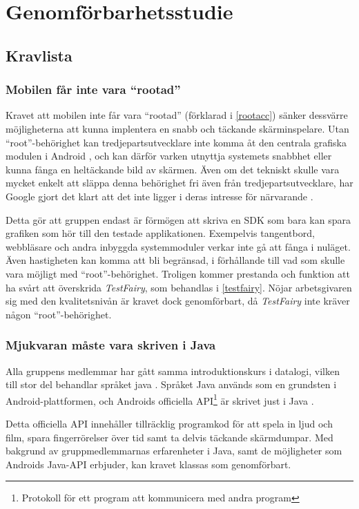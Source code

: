 \section{Genomförbarhetsstudie}
\subsection{Kravlista}
\subsubsection{Mobilen får inte vara ``rootad''}
Kravet att mobilen inte får vara ``rootad'' (förklarad i \ref{rootacc}) sänker dessvärre möjligheterna att kunna implentera en snabb och täckande skärminspelare. Utan ``root''-behörighet kan tredjepartsutvecklare inte komma åt den centrala grafiska modulen i Android \parencite{adoc}, och kan därför varken utnyttja systemets snabbhet eller kunna fånga en heltäckande bild av skärmen. Även om det tekniskt skulle vara mycket enkelt att släppa denna behörighet fri även från tredjepartsutvecklare, har Google gjort det klart att det inte ligger i deras intresse för närvarande \parencite{uhno}.

Detta gör att gruppen endast är förmögen att skriva en SDK som bara kan spara grafiken som hör till den testade applikationen. Exempelvis tangentbord, webbläsare och andra inbyggda systemmoduler verkar inte gå att fånga i nuläget. Även hastigheten kan komma att bli begränsad, i förhållande till vad som skulle vara möjligt med ``root''-behörighet. Troligen kommer prestanda och funktion att ha svårt att överskrida \textit{TestFairy}, som behandlas i \ref{testfairy}. Nöjar arbetsgivaren sig med den kvalitetsnivån är kravet dock genomförbart, då \textit{TestFairy} inte kräver någon ``root''-behörighet.

\subsubsection{Mjukvaran måste vara skriven i Java}
Alla gruppens medlemmar har gått samma introduktionskurs i datalogi, vilken till stor del behandlar språket java \parencite{inda}. Språket Java används som en grundsten i Android-plattformen, och Androids officiella API\footnote{Protokoll för ett program att kommunicera med andra program} är skrivet just i Java \parencite{adoc}. 

Detta officiella API innehåller tillräcklig programkod för att spela in ljud och film, spara fingerrörelser över tid samt ta delvis täckande skärmdumpar. Med bakgrund av gruppmedlemmarnas erfarenheter i Java, samt de möjligheter som Androids Java-API erbjuder, kan kravet klassas som genomförbart.


